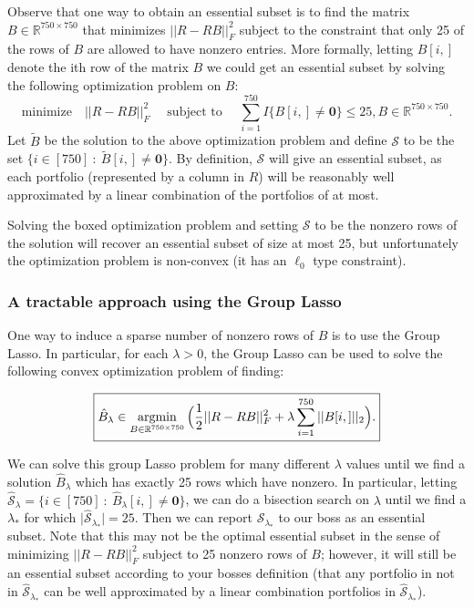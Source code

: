 Observe that one way to obtain an essential subset is to find the matrix $B \in \mathbb{R}^{750 \times 750}$ that minimizes $\vert \vert R - R B \vert \vert_{F}^2$ subject to the constraint that only 25 of the rows of $B$ are allowed to have nonzero entries. More formally, letting $B[i,]$ denote the ith row of the matrix $B$ we could get an essential subset by solving the following optimization problem on $B$: 
$$\boxed{\text{minimize} \quad \vert \vert R - R B \vert \vert_{F}^2 \quad \text{ subject to } \quad \sum_{i=1}^{750} I \{ B[i,] \neq \mathbf{0} \} \leq 25 , B \in  \mathbb{R}^{750 \times 750} }.$$ 
Let $\tilde{B}$ be the solution to the above optimization problem and define $\mathcal{S}$ to be the set  $\{ i \in [750] \ : \ \tilde{B}[i,] \neq \mathbf{0} \}$.  By definition, $\mathcal{S}$ will give an essential subset, as each portfolio (represented by a column in $R$) will be reasonably well approximated by a linear combination of the portfolios of at most. 

Solving the boxed optimization problem and setting $\mathcal{S}$ to be the nonzero rows of the solution will recover an essential subset of size at most 25, but unfortunately the optimization problem is non-convex (it has an $\ell_0$ type constraint).


\subsubsection*{A tractable approach using the Group Lasso}


One way to induce a sparse number of nonzero rows of $B$ is to use the Group Lasso. In particular, for each $\lambda>0$, the Group Lasso can be used to solve the following convex optimization problem of finding:

$$\boxed{\hat{B}_{\lambda} \in \operatorname*{argmin}_{B \in \mathbb{R}^{750 \times 750}} \Big( \frac{1}{2}  \vert \vert R - R B \vert \vert_{F}^2 + \lambda \sum_{i=1}^{750} \vert \vert B[i,] \vert \vert_2 \Big).}$$

We can solve this group Lasso problem for many different $\lambda$ values until we find a solution $\hat{B}_{\lambda}$ which has exactly 25 rows which have nonzero. In particular, letting $\hat{\mathcal{S}}_{\lambda}=  \{ i \in [750] \ : \ \hat{B}_{\lambda}[i,] \neq \mathbf{0} \}$, we can do a bisection search on $\lambda$ until we find a $\lambda_*$ for which $\vert \hat{\mathcal{S}}_{\lambda_*} \vert =25$. Then we can report $\hat{\mathcal{S}}_{\lambda_*}$ to our boss as an essential subset. Note that this may not be the optimal essential subset in the sense of minimizing $\vert \vert R - R B \vert \vert_{F}^2$ subject to 25 nonzero rows of $B$; however, it will still be an essential subset according to your bosses definition (that any portfolio in not in $\hat{\mathcal{S}}_{\lambda_*}$ can be well approximated by a linear combination portfolios in $\hat{\mathcal{S}}_{\lambda_*}$).



